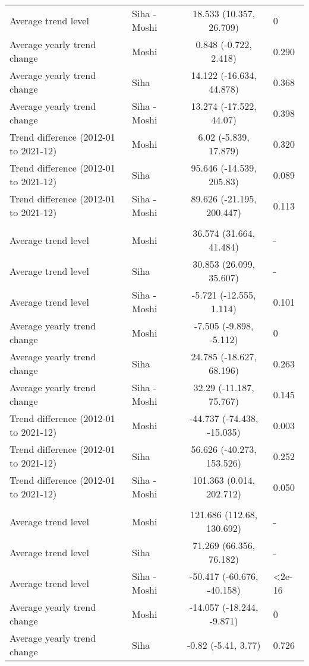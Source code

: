 \begin{longtable}{l|lcl}
Average trend level & Siha - Moshi & 18.533 (10.357, 26.709) & 0 \\ 
Average yearly trend change & Moshi & 0.848 (-0.722, 2.418) & 0.290 \\ 
Average yearly trend change & Siha & 14.122 (-16.634, 44.878) & 0.368 \\ 
Average yearly trend change & Siha - Moshi & 13.274 (-17.522, 44.07) & 0.398 \\ 
Trend difference (2012-01 to 2021-12) & Moshi & 6.02 (-5.839, 17.879) & 0.320 \\ 
Trend difference (2012-01 to 2021-12) & Siha & 95.646 (-14.539, 205.83) & 0.089 \\ 
Trend difference (2012-01 to 2021-12) & Siha - Moshi & 89.626 (-21.195, 200.447) & 0.113 \\ 
\midrule\addlinespace[2.5pt]
\multicolumn{4}{l}{Dysentery} \\ 
\midrule\addlinespace[2.5pt]
Average trend level & Moshi & 36.574 (31.664, 41.484) & - \\ 
Average trend level & Siha & 30.853 (26.099, 35.607) & - \\ 
Average trend level & Siha - Moshi & -5.721 (-12.555, 1.114) & 0.101 \\ 
Average yearly trend change & Moshi & -7.505 (-9.898, -5.112) & 0 \\ 
Average yearly trend change & Siha & 24.785 (-18.627, 68.196) & 0.263 \\ 
Average yearly trend change & Siha - Moshi & 32.29 (-11.187, 75.767) & 0.145 \\ 
Trend difference (2012-01 to 2021-12) & Moshi & -44.737 (-74.438, -15.035) & 0.003 \\ 
Trend difference (2012-01 to 2021-12) & Siha & 56.626 (-40.273, 153.526) & 0.252 \\ 
Trend difference (2012-01 to 2021-12) & Siha - Moshi & 101.363 (0.014, 202.712) & 0.050 \\ 
\midrule\addlinespace[2.5pt]
\multicolumn{4}{l}{Epilepsy} \\ 
\midrule\addlinespace[2.5pt]
Average trend level & Moshi & 121.686 (112.68, 130.692) & - \\ 
Average trend level & Siha & 71.269 (66.356, 76.182) & - \\ 
Average trend level & Siha - Moshi & -50.417 (-60.676, -40.158) & <2e-16 \\ 
Average yearly trend change & Moshi & -14.057 (-18.244, -9.871) & 0 \\ 
Average yearly trend change & Siha & -0.82 (-5.41, 3.77) & 0.726 \\ 

\end{longtable}
